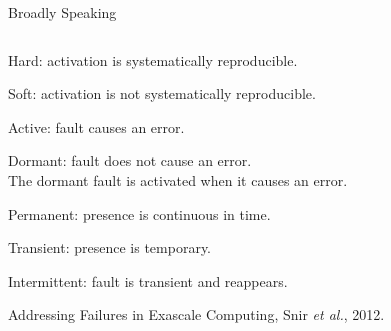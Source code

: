 \begin{frame}{Broadly Speaking}

\begin{columns}
\begin{column}{1.1\textwidth}
\bi
\item Hard: activation is systematically reproducible.

\ssk 
\item Soft: activation is not systematically reproducible.

\ssk 
\item Active: fault causes an error.

\ssk 
\item Dormant: fault does not cause an error. \\
The dormant fault is activated when it causes an error. 

\ssk 
\item Permanent: presence is continuous in time.

\ssk 
\item Transient: presence is temporary.

\ssk 
\item Intermittent: fault is transient and reappears.

\bbk
{\footnotesize Addressing Failures in Exascale Computing, 
Snir {\it et al.}, 2012.}
\ei
\end{column}
\end{columns}
%
\end{frame}










